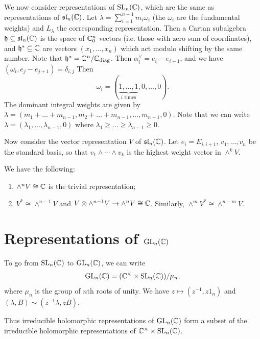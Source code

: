 \begin{remark}
  We now consider representations of
  $\operatorname{SL}_n(\mathbb{C})$, which are the
  same as representations of
  $\mathfrak{sl}_n(\mathbb{C})$.
  Let $\lambda = \sum_{i = 1}^{n - 1} m_i \omega_i$
  (the $\omega_i$ are the fundamental
  weights) and $L_\lambda$ the
  corresponding representation.
  Then a Cartan subalgebra $\mathfrak{h} \subseteq \mathfrak{sl}_n(\mathbb{C})$
  is the space of $\mathbb{C}_0^n$ vectors
  (i.e. those with zero sum of
  coordinates), and
  $\mathfrak{h}^* \subseteq \mathbb{C}$
  are vectors $(x_1, \dots, x_n)$ which
  act modulo shifting by the same
  number. Note that
  $\mathfrak{h}^* = \mathbb{C}^n / \mathbb{C}_{\mathrm{diag}}$.
  Then
  $\alpha_i^\vee = e_i - e_{i + 1}$, and
  we have
  $(\omega_i, e_j - e_{j + 1}) = \delta_{i, j}$
  Then
  \[
    \omega_i = (\underbrace{1, \dots, 1}_{i \text{ times}}, 0, \dots, 0).
  \]
  The dominant integral weights are
  given by $\lambda = (m_1 + \dots + m_{n - 1}, m_2 + \dots + m_{n - 1}, \dots, m_{n - 1}, 0)$.
  Note that we can write
  $\lambda = (\lambda_1, \dots, \lambda_{n - 1}, 0)$
  where $\lambda_1 \ge \dots \ge \lambda_{n - 1} \ge 0$.

  Now consider the vector representation $V$
  of $\mathfrak{sl}_n(\mathbb{C})$. Let
  $e_i = E_{i, i + 1}$,
  $v_1, \dots, v_n$ be the standard basis,
  so that
  $v_{1} 
  \wedge \cdots \wedge v_{k}$ is the
  highest weight vector in $\wedge^k V$.
\end{remark}

\begin{remark}
  We have the following:
  \begin{enumerate}
    \item $\wedge^n V \cong \mathbb{C}$ is
      the trivial representation;
    \item $V^* \cong \wedge^{n - 1} V$ and
      $V \otimes \wedge^{n - 1} V \to \wedge^n  V \cong \mathbb{C}$.
      Similarly,
      $\wedge^m V^* \cong \wedge^{n - m} V$.
  \end{enumerate}
\end{remark}

\section{Representations of \texorpdfstring{$\operatorname{GL}_n(\mathbb{C})$}{GL(n, C)}}

\begin{remark}
  To go from $\operatorname{SL}_n(\mathbb{C})$ to
  $\operatorname{GL}_n(\mathbb{C})$, we can write
  \[
    \operatorname{GL}_n(\mathbb{C})
    = (\mathbb{C}^\times \times \operatorname{SL}_n(\mathbb{C})) / \mu_n,
  \]
  where $\mu_n$ is the group of
  $n$th roots of unity.
  We have $z \mapsto (z^{-1}, z 1_n)$
  and $(\lambda, B) \sim (z^{-1} \lambda, z B)$.

  Thus irreducible holomorphic representations
  of $\operatorname{GL}_n(\mathbb{C})$ form a subset of the
  irreducible holomorphic representations
  of $\mathbb{C}^\times \times \operatorname{SL}_n(\mathbb{C})$.
\end{remark}

